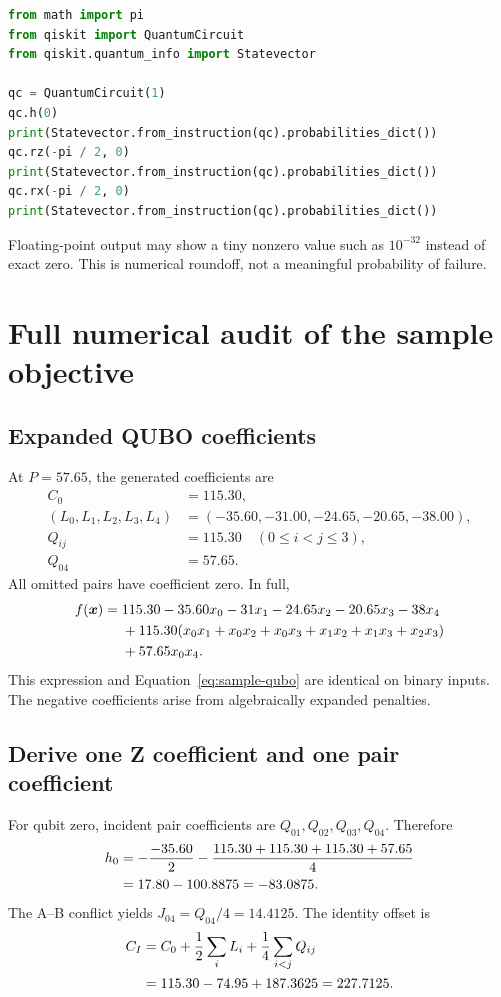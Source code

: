 \begin{lstlisting}[language=Python]
from math import pi
from qiskit import QuantumCircuit
from qiskit.quantum_info import Statevector

qc = QuantumCircuit(1)
qc.h(0)
print(Statevector.from_instruction(qc).probabilities_dict())
qc.rz(-pi / 2, 0)
print(Statevector.from_instruction(qc).probabilities_dict())
qc.rx(-pi / 2, 0)
print(Statevector.from_instruction(qc).probabilities_dict())
\end{lstlisting}
Floating-point output may show a tiny nonzero value such as $10^{-32}$ instead
of exact zero. This is numerical roundoff, not a meaningful probability of failure.

\clearpage
\section{Full numerical audit of the sample objective}\label{app:numeric}
\subsection{Expanded QUBO coefficients}
At $P=57.65$, the generated coefficients are
\begin{align}
C_0&=115.30,\\
(L_0,L_1,L_2,L_3,L_4)&=(-35.60,-31.00,-24.65,-20.65,-38.00),\\
Q_{ij}&=115.30\quad(0\le i<j\le3),\\
Q_{04}&=57.65.
\end{align}
All omitted pairs have coefficient zero. In full,
\begin{align}
f(\boldsymbol{x})={}&115.30-35.60x_0-31x_1-24.65x_2-20.65x_3-38x_4\notag\\
&+115.30(x_0x_1+x_0x_2+x_0x_3+x_1x_2+x_1x_3+x_2x_3)\notag\\
&+57.65x_0x_4.
\end{align}
This expression and Equation~\eqref{eq:sample-qubo} are identical on binary
inputs. The negative coefficients arise from algebraically expanded penalties.

\subsection{Derive one Z coefficient and one pair coefficient}
For qubit zero, incident pair coefficients are $Q_{01},Q_{02},Q_{03},Q_{04}$.
Therefore
\begin{align}
h_0&=-\frac{-35.60}{2}
-\frac{115.30+115.30+115.30+57.65}{4}\notag\\
&=17.80-100.8875=-83.0875.
\end{align}
The A--B conflict yields $J_{04}=Q_{04}/4=14.4125$.
The identity offset is
\begin{align}
C_I&=C_0+\frac12\sum_iL_i+\frac14\sum_{i<j}Q_{ij}\notag\\
&=115.30-74.95+187.3625=227.7125.
\end{align}

